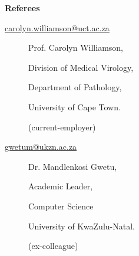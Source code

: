 \begin{description}\item[] \begin{description}\item[] {\bf  Referees  }
\begin{description}
\item[]
\item[]
\item[]

\item[\url{carolyn.williamson@uct.ac.za}] 
 \item[] Prof. Carolyn Williamson, 
 \item[] Division of Medical Virology, 
 \item[] Department of Pathology, 
 \item[] University of Cape Town.
\item[] (current-employer)
\item[]

\item[\url{gwetum@ukzn.ac.za}] 
 \item[] Dr. Mandlenkosi Gwetu,
 \item[] Academic Leader,
 \item[] Computer Science
 \item[] University of KwaZulu-Natal.
 \item[] (ex-colleague) 
\item[]


%


 \end{description}
\end{description}
\end{description}

